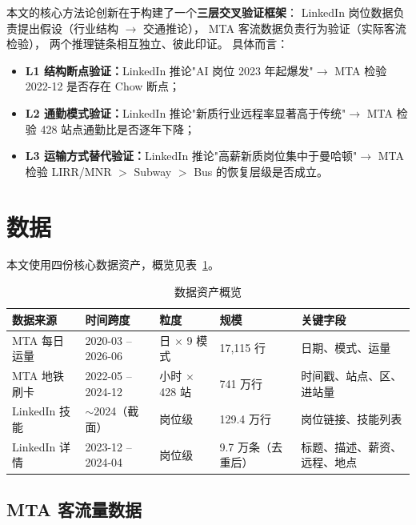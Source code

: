 \documentclass[runningheads]{llncs}
\begin{document}
本文的核心方法论创新在于构建了一个\textbf{三层交叉验证框架}：
LinkedIn 岗位数据负责提出假设（行业结构 $\to$ 交通推论），
MTA 客流数据负责行为验证（实际客流检验），
两个推理链条相互独立、彼此印证。
具体而言：
\begin{itemize}
  \item \textbf{L1 结构断点验证：}LinkedIn 推论"AI 岗位 2023 年起爆发"$\to$
        MTA 检验 2022-12 是否存在 Chow 断点；
  \item \textbf{L2 通勤模式验证：}LinkedIn 推论"新质行业远程率显著高于传统"$\to$
        MTA 检验 428 站点通勤比是否逐年下降；
  \item \textbf{L3 运输方式替代验证：}LinkedIn 推论"高薪新质岗位集中于曼哈顿"$\to$
        MTA 检验 LIRR/MNR $>$ Subway $>$ Bus 的恢复层级是否成立。
\end{itemize}

\section{数据}

本文使用四份核心数据资产，概览见表~\ref{tab:data}。

\begin{table}[H]
\centering
\caption{数据资产概览}
\label{tab:data}
\footnotesize
\begin{tabular}{@{}p{2.5cm}p{2.2cm}p{2.3cm}p{1.6cm}p{2.5cm}@{}}
\toprule
\textbf{数据来源} & \textbf{时间跨度} & \textbf{粒度} & \textbf{规模} & \textbf{关键字段} \\
\midrule
MTA 每日运量   & 2020-03 -- 2026-06 & 日 $\times$ 9 模式 & 17,115 行 & 日期、模式、运量 \\
MTA 地铁刷卡   & 2022-05 -- 2024-12 & 小时 $\times$ 428 站 & 741 万行 & 时间戳、站点、区、进站量 \\
LinkedIn 技能  & $\sim$2024（截面） & 岗位级 & 129.4 万行 & 岗位链接、技能列表 \\
LinkedIn 详情  & 2023-12 -- 2024-04 & 岗位级 & 9.7 万条（去重后） & 标题、描述、薪资、远程、地点 \\
\bottomrule
\end{tabular}
\end{table}

\subsection{MTA 客流量数据}
\end{document}
